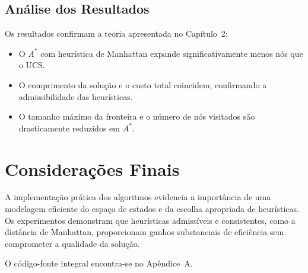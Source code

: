 \subsection{Análise dos Resultados}  
  
Os resultados confirmam a teoria apresentada no Capítulo~2:  
\begin{itemize}  
    \item O $A^*$ com heurística de Manhattan expande significativamente menos nós que o UCS.  
    \item O comprimento da solução e o custo total coincidem, confirmando a admissibilidade das heurísticas.  
    \item O tamanho máximo da fronteira e o número de nós visitados são drasticamente reduzidos em $A^*$.  
\end{itemize}  
  
\section{Considerações Finais}  
  
A implementação prática dos algoritmos evidencia a importância de uma modelagem eficiente do espaço de estados e da escolha apropriada de heurísticas. Os experimentos demonstram que heurísticas admissíveis e consistentes, como a distância de Manhattan, proporcionam ganhos substanciais de eficiência sem comprometer a qualidade da solução.  
  
O código-fonte integral encontra-se no Apêndice~A.  
  
